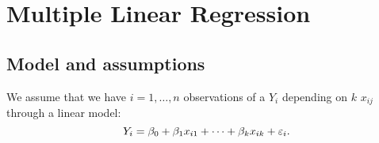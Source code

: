 \section{Multiple Linear Regression}
\subsection{Model and assumptions}

We assume that we have $i=1,\dots,n$ observations of a  $Y_i$ depending on $k$  $x_{ij}$ through a linear model:
$$
    Y_i = \beta_0 + \beta_1 x_{i1} + \dots + \beta_k x_{ik} + \varepsilon_i.
$$



